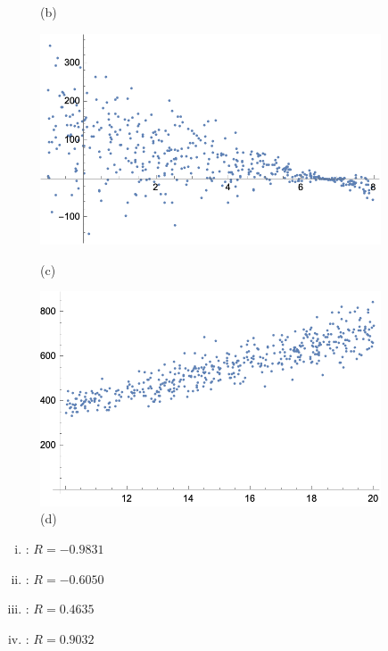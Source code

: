 \documentclass[12pt,letterpaper]{exam}
\begin{document}
\begin{questions}
\begin{figure}[!ht]
\begin{minipage}{0.45\textwidth}
	   \caption*{(b)}
	\end{minipage}
	\begin{minipage}{0.45\textwidth}
	   \centering
	   \includegraphics[width=0.9\textwidth]{reg3.png}
	   \caption*{(c)}
	\end{minipage}
	\begin{minipage}{0.45\textwidth}
	   \centering
	   \includegraphics[width=0.9\textwidth]{reg4.png}
	   \caption*{(d)}
	\end{minipage}
	\end{figure} \pspace

\begin{enumerate}[(i)]
\item \underline{\hspace{1.5cm}}: $R= -0.9831$ \pspace
\item \underline{\hspace{1.5cm}}: $R= -0.6050$ \pspace
\item \underline{\hspace{1.5cm}}: $R= 0.4635$ \pspace
\item\underline{\hspace{1.5cm}}: $R= 0.9032$
\end{enumerate} 







\end{questions}
\end{document}
